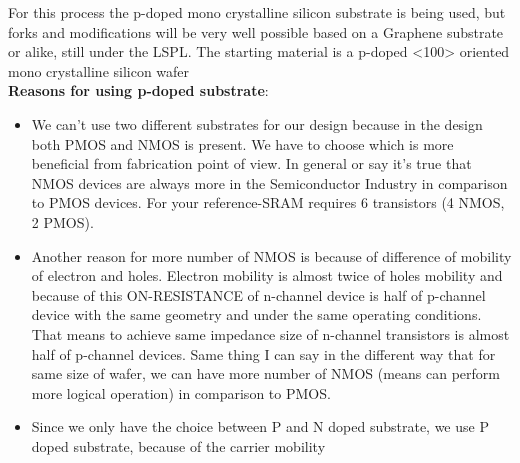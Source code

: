 For this process the p-doped mono crystalline silicon substrate is being used, but forks and modifications will be very well possible based on a Graphene substrate or alike, still under the LSPL.
The starting material is a p-doped <100> oriented mono crystalline silicon wafer\\

\textbf{Reasons for using p-doped substrate}:\begin{itemize}
\item We can't use two different substrates for our design because in the design both PMOS and NMOS is present.
We have to choose which is more beneficial from fabrication point of view.
In general or say it's true that NMOS devices are always more in the Semiconductor Industry in comparison to PMOS devices.
For your reference-SRAM requires 6 transistors (4 NMOS, 2 PMOS).
\item Another reason for more number of NMOS is because of difference of mobility of electron and holes.
Electron mobility is almost twice of holes mobility and because of this ON-RESISTANCE of n-channel device is half of p-channel device with the same geometry and under the same operating conditions.
That means to achieve same impedance size of n-channel transistors is almost half of p-channel devices.
Same thing I can say in the different way that for same size of wafer, we can have more number of NMOS (means can perform more logical operation) in comparison to PMOS.
\item Since we only have the choice between P and N doped substrate, we use P doped substrate, because of the carrier mobility
\end{itemize}